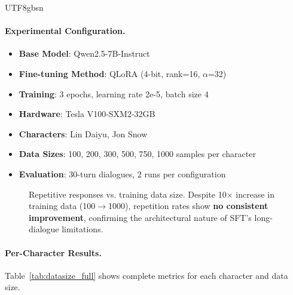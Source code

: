 \documentclass[11pt]{article}
\begin{document}
\begin{CJK*}{UTF8}{gbsn}
\paragraph{Experimental Configuration.}
\begin{itemize}
    \item \textbf{Base Model}: Qwen2.5-7B-Instruct
    \item \textbf{Fine-tuning Method}: QLoRA (4-bit, rank=16, $\alpha$=32)
    \item \textbf{Training}: 3 epochs, learning rate 2e-5, batch size 4
    \item \textbf{Hardware}: Tesla V100-SXM2-32GB
    \item \textbf{Characters}: Lin Daiyu, Jon Snow
    \item \textbf{Data Sizes}: 100, 200, 300, 500, 750, 1000 samples per character
    \item \textbf{Evaluation}: 30-turn dialogues, 2 runs per configuration
\end{itemize}

\begin{figure}[h]
\centering
{}
\caption{Repetitive responses vs. training data size. Despite 10$\times$ increase in training data (100$\rightarrow$1000), repetition rates show \textbf{no consistent improvement}, confirming the architectural nature of SFT's long-dialogue limitations.}
\label{fig:datasize_ablation}
\end{figure}

\paragraph{Per-Character Results.} Table~\ref{tab:datasize_full} shows complete metrics for each character and data size.


\end{CJK*}
\end{document}
